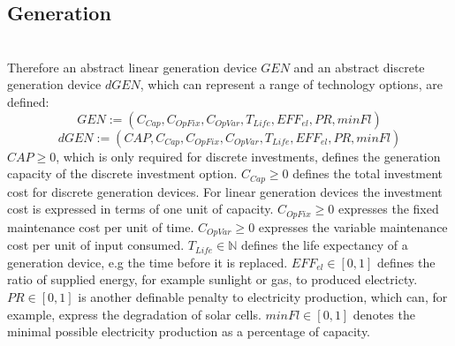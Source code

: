\documentclass[
	11pt,								%
	DIV10,								%
	a4paper,         					%
	oneside,							%
	headheight=20pt,					%
	footheight=20pt,					%
    parskip=full,						%
    listof=totoc,						%
	bibliography=totoc,					%
	index=totoc,						%
]{scrartcl}
\begin{document}
\subsection{Generation}
\\
Therefore an abstract linear generation device $GEN$ and an abstract discrete generation device $dGEN$, which can represent a range of technology options, are defined:\\
	\begin{equation}
		GEN := (C_{Cap}, C_{OpFix}, C_{OpVar}, T_{Life}, EFF_{el}, PR, minFl)
	\end{equation}
	\begin{equation}
		dGEN := (CAP, C_{Cap}, C_{OpFix}, C_{OpVar}, T_{Life}, EFF_{el}, PR, minFl)
	\end{equation}
	$CAP \geq 0$, which is only required for discrete investments, defines the generation capacity of the discrete investment option.
	$C_{Cap} \geq 0$ defines the total investment cost for discrete generation devices. For linear generation devices the investment cost is expressed in terms of one unit of capacity.
	$C_{OpFix} \geq 0$ expresses the fixed maintenance cost per unit of time.
	$C_{OpVar} \geq 0$ expresses the variable maintenance cost per unit of input consumed.
	$T_{Life} \in \mathbb{N}$ defines the life expectancy of a generation device, e.g the time before it is replaced. 
	$EFF_{el} \in [0,1]$ defines the ratio of supplied energy, for example sunlight or gas, to produced electricty.
	$PR \in [0,1]$ is another definable penalty to electricity production, which can, for example, express the degradation of solar cells. 	
	$minFl \in [0,1]$ denotes the minimal possible electricity production as a percentage of capacity.
\end{document}
